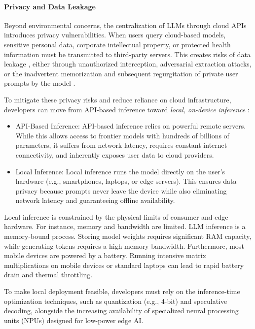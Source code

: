 \paragraph{Privacy and Data Leakage}
Beyond environmental concerns, the centralization of LLMs through cloud APIs introduces privacy vulnerabilities. When users query cloud-based models, sensitive personal data, corporate intellectual property, or protected health information must be transmitted to third-party servers. This creates risks of data leakage \citep{aiyappa-etal-2023-trust, li2024opensourcedatacontamination}, either through unauthorized interception, adversarial extraction attacks, or the inadvertent memorization and subsequent regurgitation of private user prompts by the model \citep{chen2024janus, maini2024llm, liu2022membership}.

To mitigate these privacy risks and reduce reliance on cloud infrastructure, developers can move from API-based inference toward \emph{local, on-device inference} \citep{qu2025mobile}:
\begin{itemize}
    \item API-Based Inference: API-based inference relies on powerful remote servers. While this allows access to frontier models with hundreds of billions of parameters, it suffers from network latency, requires constant internet connectivity, and inherently exposes user data to cloud providers.
    \item Local Inference: Local inference runs the model directly on the user's hardware (e.g., smartphones, laptops, or edge servers). This ensures  data privacy because prompts never leave the device while also eliminating network latency and guaranteeing offline availability.
\end{itemize}
%
Local inference is  constrained by the physical limits of consumer and edge hardware. For instance, memory and bandwidth are limited. LLM inference is  a memory-bound process. Storing model weights requires significant RAM capacity, while generating tokens  requires a high memory bandwidth. Furthermore, most mobile devices are powered by a battery. Running intensive matrix multiplications on mobile devices or standard laptops can lead to rapid battery drain and thermal throttling.

To make local deployment feasible, developers must rely on the inference-time optimization techniques, such as quantization (e.g., 4-bit) and speculative decoding, alongside the increasing availability of specialized neural processing units (NPUs) designed  for low-power edge AI.


